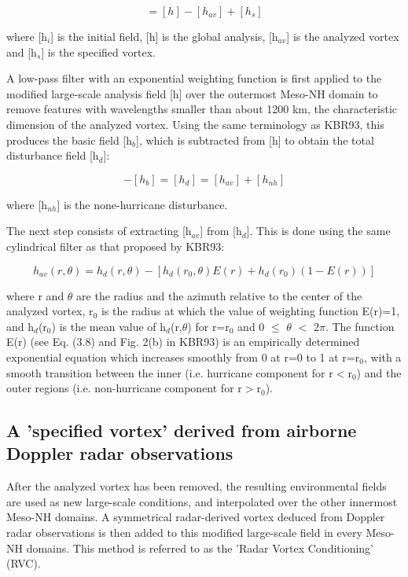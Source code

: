 \begin{equation}
[h_{i}]=[h]-[h_{av}]+[h_{s}]
\end{equation}

where [h$_{i}$] is the initial field, [h] is the global analysis, [h$_{av}$] is 
the analyzed vortex and [h$_{s}$] is the specified vortex.

A low-pass filter with an exponential weighting function is first applied to the 
modified large-scale analysis field [h] over the outermost Meso-NH domain to 
remove features with wavelengths smaller than about 1200 km, the characteristic 
dimension of the analyzed vortex. Using the same terminology as KBR93, this 
produces the basic field [h$_{b}$], which is subtracted from [h] to obtain the 
total disturbance field [h$_{d}$]:

\begin{equation}
[h]-[h_{b}]=[h_{d}]=[h_{av}]+[h_{nh}]
\label{hb}
\end{equation}

where [h$_{nh}$] is the none-hurricane disturbance.

The next step consists of extracting [h$_{av}$] from [h$_{d}$]. This is done 
using the same cylindrical filter as that proposed by KBR93:

\begin{equation}
h_{av}(r,\theta)=h_{d}(r,\theta)-[h_{d}(r_{0},\theta)E(r)+h_{d}(r_{0})(1-E(r))]
\end{equation}

where r and $\theta$ are the radius and the azimuth relative to the center  of the 
analyzed vortex, r$_{0}$ is the radius at which the value of weighting function 
E(r)=1, and h$_{d}$(r$_{0}$) is the mean value of h$_{d}$(r,$\theta$) for r=r$_{0}$ 
and 0 $\le$ $\theta$ $<$ 2$\pi$. The function E(r) (see Eq. (3.8) and Fig. 2(b) in 
KBR93) is an empirically determined exponential equation which increases smoothly 
from 0 at r=0 to 1 at r=r$_{0}$, with a smooth transition between the inner (i.e. 
hurricane component for r$<$r$_{0}$) and the outer regions (i.e. non-hurricane 
component for r$>$r$_{0}$).

\subsection{A 'specified vortex' derived from airborne Doppler radar observations}

After the analyzed vortex has been removed, the resulting environmental fields are 
used as new large-scale conditions, and interpolated over the other innermost Meso-NH 
domains. A symmetrical radar-derived vortex deduced from Doppler radar observations 
is then added to this modified large-scale field in every Meso-NH domains. This 
method is referred to as the 'Radar Vortex Conditioning' (RVC).

